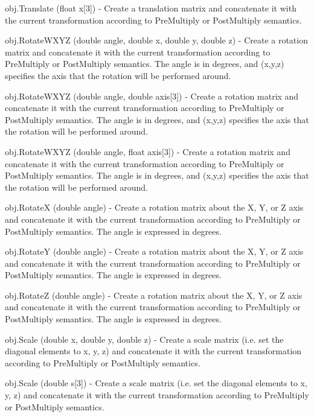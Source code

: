 \begin{DoxyItemize}
\item {\ttfamily obj.\-Translate (float x\mbox{[}3\mbox{]})} -\/ Create a translation matrix and concatenate it with the current transformation according to Pre\-Multiply or Post\-Multiply semantics.  
\item {\ttfamily obj.\-Rotate\-W\-X\-Y\-Z (double angle, double x, double y, double z)} -\/ Create a rotation matrix and concatenate it with the current transformation according to Pre\-Multiply or Post\-Multiply semantics. The angle is in degrees, and (x,y,z) specifies the axis that the rotation will be performed around.  
\item {\ttfamily obj.\-Rotate\-W\-X\-Y\-Z (double angle, double axis\mbox{[}3\mbox{]})} -\/ Create a rotation matrix and concatenate it with the current transformation according to Pre\-Multiply or Post\-Multiply semantics. The angle is in degrees, and (x,y,z) specifies the axis that the rotation will be performed around.  
\item {\ttfamily obj.\-Rotate\-W\-X\-Y\-Z (double angle, float axis\mbox{[}3\mbox{]})} -\/ Create a rotation matrix and concatenate it with the current transformation according to Pre\-Multiply or Post\-Multiply semantics. The angle is in degrees, and (x,y,z) specifies the axis that the rotation will be performed around.  
\item {\ttfamily obj.\-Rotate\-X (double angle)} -\/ Create a rotation matrix about the X, Y, or Z axis and concatenate it with the current transformation according to Pre\-Multiply or Post\-Multiply semantics. The angle is expressed in degrees.  
\item {\ttfamily obj.\-Rotate\-Y (double angle)} -\/ Create a rotation matrix about the X, Y, or Z axis and concatenate it with the current transformation according to Pre\-Multiply or Post\-Multiply semantics. The angle is expressed in degrees.  
\item {\ttfamily obj.\-Rotate\-Z (double angle)} -\/ Create a rotation matrix about the X, Y, or Z axis and concatenate it with the current transformation according to Pre\-Multiply or Post\-Multiply semantics. The angle is expressed in degrees.  
\item {\ttfamily obj.\-Scale (double x, double y, double z)} -\/ Create a scale matrix (i.\-e. set the diagonal elements to x, y, z) and concatenate it with the current transformation according to Pre\-Multiply or Post\-Multiply semantics.  
\item {\ttfamily obj.\-Scale (double s\mbox{[}3\mbox{]})} -\/ Create a scale matrix (i.\-e. set the diagonal elements to x, y, z) and concatenate it with the current transformation according to Pre\-Multiply or Post\-Multiply semantics.  

\end{DoxyItemize}
